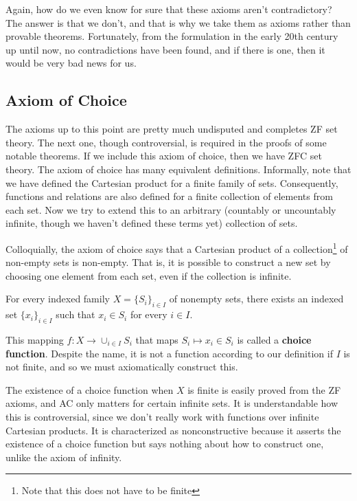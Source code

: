 \documentclass{article}
\begin{document}
    Again, how do we even know for sure that these axioms aren't contradictory? The answer is that we don't, and that is why we take them as axioms rather than provable theorems. Fortunately, from the formulation in the early 20th century up until now, no contradictions have been found, and if there is one, then it would be very bad news for us.  

  \subsection{Axiom of Choice}

    The axioms up to this point are pretty much undisputed and completes ZF set theory. The next one, though controversial, is required in the proofs of some notable theorems. If we include this axiom of choice, then we have ZFC set theory. The axiom of choice has many equivalent definitions. Informally, note that we have defined the Cartesian product for a finite family of sets. Consequently, functions and relations are also defined for a finite collection of elements from each set. Now we try to extend this to an arbitrary (countably or uncountably infinite, though we haven't defined these terms yet) collection of sets. 

    Colloquially, the axiom of choice says that a Cartesian product of a collection\footnote{Note that this does not have to be finite} of non-empty sets is non-empty. That is, it is possible to construct a new set by choosing one element from each set, even if the collection is infinite. 

    \begin{axiom}
      For every indexed family $X = \{S_i\}_{i \in I}$ of nonempty sets, there exists an indexed set $\{x_i\}_{i \in I}$ such that $x_i \in S_i$ for every $i \in I$. 
    \end{axiom}

    \begin{definition}
      This mapping $f: X \rightarrow \cup_{i \in I} S_i$ that maps $S_i \mapsto x_i \in S_i$ is called a \textbf{choice function}. Despite the name, it is not a function according to our definition if $I$ is not finite, and so we must axiomatically construct this. 
    \end{definition}

    The existence of a choice function when $X$ is finite is easily proved from the ZF axioms, and AC only matters for certain infinite sets. It is understandable how this is controversial, since we don't really work with functions over infinite Cartesian products. It is characterized as nonconstructive because it asserts the existence of a choice function but says nothing about how to construct one, unlike the axiom of infinity.  
\end{document}
